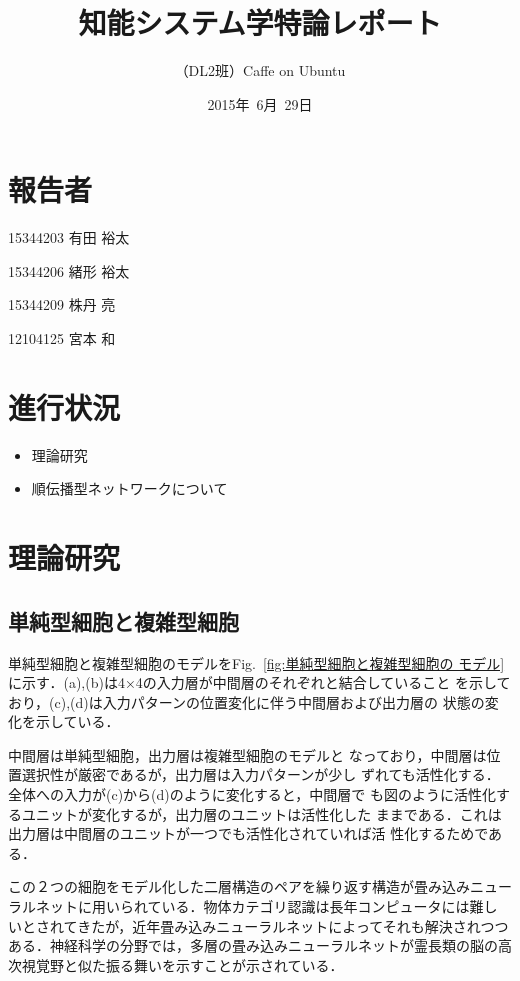 \documentclass[a4paper,10pt]{jsarticle}
\title{知能システム学特論レポート}
\author{
（DL2班）Caffe on Ubuntu\\
}
\date{2015年\ 6月\ 29日}
\begin{document}
\maketitle
\section{報告者}
\begin{list}{}{}
 \item 15344203\hspace{0.5cm} 有田 裕太
 \item 15344206\hspace{0.5cm} 緒形 裕太
 \item 15344209\hspace{0.5cm} 株丹 亮
 \item 12104125\hspace{0.5cm} 宮本 和
\end{list}

\section{進行状況}

\begin{itemize}
\item 理論研究
\item 順伝播型ネットワークについて
\end{itemize}

\section{理論研究}
\subsection{単純型細胞と複雑型細胞}
単純型細胞と複雑型細胞のモデルをFig.~\ref{fig:単純型細胞と複雑型細胞の
モデル}に示す．(a),(b)は4×4の入力層が中間層のそれぞれと結合していること
を示しており，(c),(d)は入力パターンの位置変化に伴う中間層および出力層の
状態の変化を示している．

中間層は単純型細胞，出力層は複雑型細胞のモデルと
なっており，中間層は位置選択性が厳密であるが，出力層は入力パターンが少し
ずれても活性化する．全体への入力が(c)から(d)のように変化すると，中間層で
も図のように活性化するユニットが変化するが，出力層のユニットは活性化した
ままである．これは出力層は中間層のユニットが一つでも活性化されていれば活
性化するためである．

この２つの細胞をモデル化した二層構造のペアを繰り返す構造が畳み込みニュー
ラルネットに用いられている．物体カテゴリ認識は長年コンピュータには難し
いとされてきたが，近年畳み込みニューラルネットによってそれも解決されつつ
ある．神経科学の分野では，多層の畳み込みニューラルネットが霊長類の脳の高
次視覚野と似た振る舞いを示すことが示されている．
\end{document}
